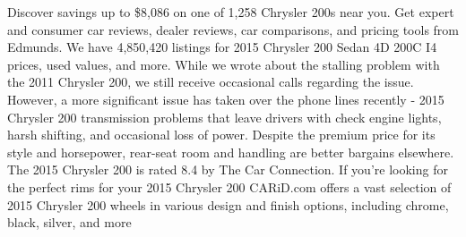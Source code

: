 \documentclass[table]{article}
\begin{document}
\begin{tcolorbox}[colback=gray!20, colframe=gray!75, rounded corners, sharp corners=northeast, sharp corners=southwest]
{Discover savings up to \$8,086 on one of 1,258 Chrysler 200s near you. Get expert and consumer car reviews, dealer reviews, car comparisons, and pricing tools from Edmunds. We have 4,850,420 listings for 2015 Chrysler 200 Sedan 4D 200C I4 prices, used values, and more. While we wrote about the stalling problem with the 2011 Chrysler 200, we still receive occasional calls regarding the issue. However, a more significant issue has taken over the phone lines recently - 2015 Chrysler 200 transmission problems that leave drivers with check engine lights, harsh shifting, and occasional loss of power. Despite the premium price for its style and horsepower, rear-seat room and handling are better bargains elsewhere. The 2015 Chrysler 200 is rated 8.4 by The Car Connection. If you're looking for the perfect rims for your 2015 Chrysler 200 CARiD.com offers a vast selection of 2015 Chrysler 200 wheels in various design and finish options, including chrome, black, silver, and more}
\end{tcolorbox}

\clearpage
\end{document}
